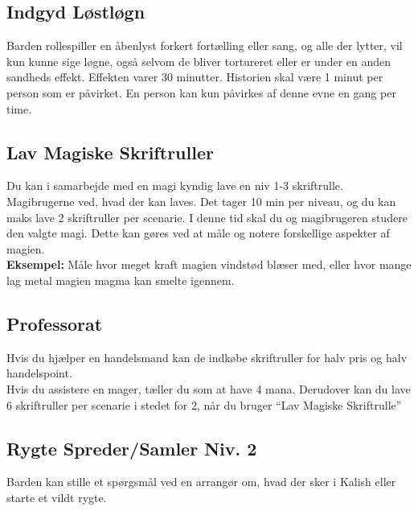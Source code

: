 \subsection{Indgyd Løstløgn}
Barden rollespiller en åbenlyst forkert fortælling eller sang, og alle der lytter, vil kun kunne sige løgne, også selvom de bliver tortureret eller er under en anden sandheds effekt. Effekten varer 30 minutter. Historien skal være 1 minut per person som er påvirket. En person kan kun påvirkes af denne evne en gang per time.

\subsection{Lav Magiske Skriftruller}
Du kan i samarbejde med en magi kyndig lave en niv 1-3 skriftrulle. Magibrugerne ved, hvad der kan laves. Det tager 10 min per niveau, og du kan maks lave 2 skriftruller per scenarie. I denne tid skal du og magibrugeren studere den valgte magi. Dette kan gøres ved at måle og notere forskellige aspekter af magien.\\ \textbf{Eksempel:} Måle hvor meget kraft magien vindstød blæser med, eller hvor mange lag metal magien magma kan smelte igennem.

\subsection{Professorat}
Hvis du hjælper en handelsmand kan de indkøbe skriftruller for halv pris og halv handelspoint.\\
Hvis du assistere en mager, tæller du som at have 4 mana.
Derudover kan du lave 6 skriftruller per scenarie i stedet for 2, når du bruger “Lav Magiske Skriftrulle”

\subsection{Rygte Spreder/Samler Niv. 2}
Barden kan stille et spørgsmål ved en arrangør om, hvad der sker i Kalish eller starte et vildt rygte.
